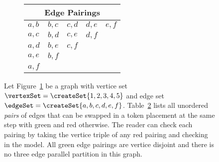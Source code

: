 \begin{figure}[H]
\begin{subfigure}{0.45\textwidth}
\begin{tikzpicture}
    \end{tikzpicture}
    \caption{}
    \label{img:form2-example:a}
    \end{subfigure}
    \begin{subfigure}{0.45\textwidth}
    \centering
        \begin{tabular}{|l|l|l|l|l|}
        \hline
        \multicolumn{5}{|c|}{Edge Pairings}   \\ \hline
        {\cellcolor{red-negat}}$a,b$ & {\cellcolor{green-chk}}$b,c$ & {\cellcolor{green-chk}}$c,d$ & {\cellcolor{red-negat}}$d,e$ & {\cellcolor{green-chk}}$e,f$ \\ \hline
        {\cellcolor{red-negat}}$a,c$ & {\cellcolor{red-negat}}$b,d$ & {\cellcolor{red-negat}}$c,e$ & {\cellcolor{red-negat}}$d,f$ & {\cellcolor{gray-node}} \\ \hline
        {\cellcolor{green-chk}}$a,d$ & {\cellcolor{red-negat}}$b,e$ & {\cellcolor{red-negat}}$c,f$ & {\cellcolor{gray-node}} & {\cellcolor{gray-node}} \\ \hline
        {\cellcolor{red-negat}}$a,e$ & {\cellcolor{red-negat}}$b,f$ & {\cellcolor{gray-node}} & {\cellcolor{gray-node}} & {\cellcolor{gray-node}} \\ \hline
        {\cellcolor{green-chk}}$a,f$ & {\cellcolor{gray-node}} & {\cellcolor{gray-node}} & {\cellcolor{gray-node}} & {\cellcolor{gray-node}} \\ \hline
        \end{tabular}
    \caption{}
    \label{img:form2-example:b}
    \end{subfigure}
    \caption{Let Figure~\ref{img:form2-example:a} be a graph with vertice set $\vertexSet = \createSet{1,2,3,4,5}$
    and edge set $\edgeSet = \createSet{a,b,c,d,e,f}$.
    Table~\ref{img:form2-example:b} lists all unordered \textit{pairs} of edges that can be swapped in a token 
    placement at the same step with green and red otherwise.
    The reader can check each pairing by taking the vertice triple of any red pairing and checking in the model.
    All green edge pairings are vertice disjoint and there is no three edge parallel partition in this graph.}
    \label{img:form2-example}
\end{figure}
